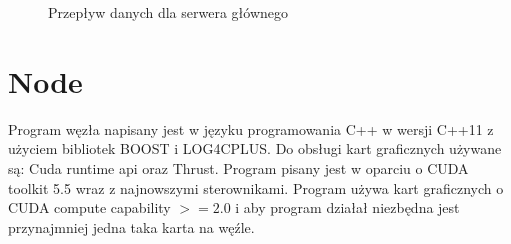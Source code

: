\documentclass[paper=a4, fontsize=11pt]{scrartcl} %
\numberwithin{equation}{section} %
\numberwithin{figure}{section} %
\numberwithin{table}{section} %
\begin{document}
		\begin{figure}[t]
			\begin{center}
				\caption{Przepływ danych dla serwera głównego}
			\end{center}
		\end{figure}
		\clearpage

\section{Node}
	Program węzła napisany jest w języku programowania C++ w wersji C++11 z użyciem bibliotek BOOST i LOG4CPLUS. Do obsługi kart 
	graficznych używane są: Cuda runtime api oraz Thrust. Program pisany jest w oparciu o CUDA toolkit 5.5 wraz z najnowszymi sterownikami. 
	Program używa kart graficznych o CUDA compute capability $>= 2.0$ i aby program działał niezbędna jest przynajmniej jedna taka karta na węźle.   
\end{document}
